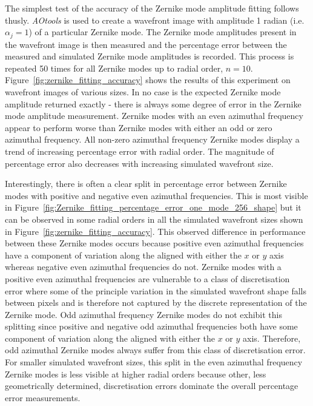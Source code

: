 The simplest test of the accuracy of the Zernike mode amplitude fitting  
follows thusly. \textit{AOtools} is used to create a wavefront image with 
amplitude 1 radian (i.e. $\alpha_{j} = 1$) of a particular Zernike mode. The 
Zernike mode amplitudes present in the wavefront image is then measured and 
the percentage error between the measured and simulated Zernike mode 
amplitudes is recorded. This process is repeated 50 times for all Zernike 
modes up to radial order, $n = 10$. Figure~\ref{fig:zernike_fitting_accuracy} 
shows the results of this experiment on wavefront images of various sizes. In 
no case is the expected Zernike mode amplitude returned exactly - there is 
always some degree of error in the Zernike mode amplitude measurement. 
Zernike modes with an even azimuthal frequency appear to perform worse than 
Zernike modes with either an odd or zero azimuthal frequency. All non-zero 
azimuthal frequency Zernike modes display a trend of increasing percentage 
error with radial order. The magnitude of percentage error also decreases 
with increasing simulated wavefront size. 

Interestingly, there is often a clear split in percentage error between 
Zernike modes with positive and negative even azimuthal frequencies. This is most visible in 
Figure~\ref{fig:Zernike_fitting_percentage_error_one_mode_256_shape} but it 
can be observed in some radial orders in all the simulated wavefront sizes 
shown in Figure~\ref{fig:zernike_fitting_accuracy}. This observed difference 
in performance between these Zernike modes occurs because positive even 
azimuthal frequencies have a component of variation along the aligned with 
either the $x$ or $y$ axis whereas negative even azimuthal frequencies do 
not. Zernike modes with a positive even azimuthal frequencies are vulnerable 
to a class of discretisation error where some of the principle variation in 
the simulated wavefront shape falls between pixels and is therefore not 
captured by the discrete representation of the Zernike mode. Odd azimuthal 
frequency Zernike modes do not exhibit this splitting since positive and 
negative odd azimuthal frequencies both have some component of variation 
along the aligned with either the $x$ or $y$ axis. Therefore, odd azimuthal 
Zernike modes always suffer from this class of discretisation error. For 
smaller simulated wavefront sizes, this split in the even azimuthal frequency 
Zernike modes is less visible at higher radial orders because other, less 
geometrically determined, discretisation errors dominate the overall 
percentage error measurements.

